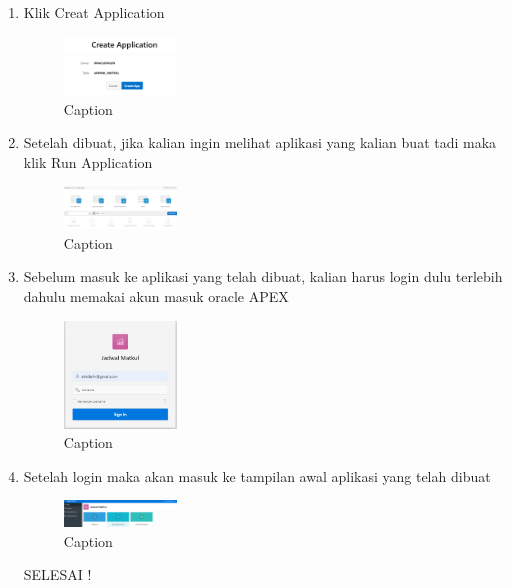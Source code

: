 \documentclass{article}
\begin{document}
\begin{enumerate}
    \item Klik Creat Application
    \begin{figure}[!htbp]
        \centering
        \includegraphics [width=3cm]{figure/Capture13.PNG}
        \caption{Caption}
        \label{fig:my_label}
    \end{figure}
    
    \item Setelah dibuat, jika kalian ingin melihat aplikasi yang kalian buat tadi maka klik Run Application
    \begin{figure}[!htbp]
        \centering
        \includegraphics [width=3cm]{figure/Capture7.PNG}
        \caption{Caption}
        \label{fig:my_label}
    \end{figure}
    
    \item Sebelum masuk ke aplikasi yang telah dibuat, kalian harus login dulu terlebih dahulu memakai akun masuk oracle APEX
     \begin{figure}[!htbp]
        \centering
        \includegraphics [width=3cm]{figure/Capture8.PNG}
        \caption{Caption}
        \label{fig:my_label}
    \end{figure}
    
    \item Setelah login maka akan masuk ke tampilan awal aplikasi yang telah dibuat
     \begin{figure}[!htbp]
        \centering
        \includegraphics [width=3cm]{figure/Capture9.PNG}
        \caption{Caption}
        \label{fig:my_label}
    \end{figure}
    
    SELESAI !
\end{enumerate}
\end{document}
